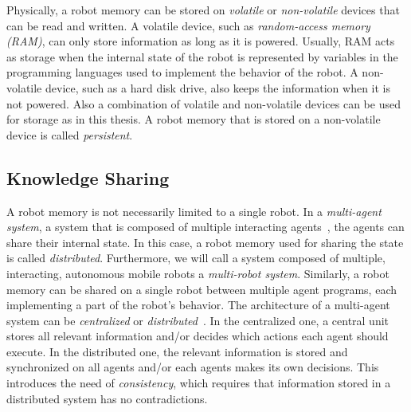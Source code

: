 Physically, a robot memory can be stored on \emph{volatile} or
\emph{non-volatile} devices that can be read and written. A volatile
device, such as \emph{random-access memory (RAM)}, can only store
information as long as it is powered. Usually, RAM acts as storage
when the internal state of the robot is represented by variables in
the programming languages used to implement the behavior of the
robot.  A non-volatile device, such as a hard disk drive, also keeps
the information when it is not powered. Also a combination of volatile
and non-volatile devices can be used for storage as in this thesis. A
robot memory that is stored on a non-volatile device is called
\emph{persistent}.

\subsection{Knowledge Sharing}
\label{sec:knowledge-sharing}
A robot memory is not necessarily limited to a single robot. In a
\emph{multi-agent system}, a system that is composed of multiple
interacting agents~\cite{multiagentsystems}, the agents can share
their internal state. In this case, a robot memory used for sharing
the state is called
\emph{distributed}. Furthermore, we will call a system composed
of multiple, interacting, autonomous mobile robots a \emph{multi-robot
  system}. Similarly, a robot memory can be shared on a single
robot between multiple agent programs, each implementing a part of
the robot's behavior. The architecture of a multi-agent system can be
\emph{centralized} or \emph{distributed}~\cite{RCLL-Planning}. In the centralized one,
a central unit stores all relevant information and/or decides which
actions each agent should execute. In the distributed one, the
relevant information is stored and synchronized on all agents and/or
each agents makes its own decisions. This introduces the need of
\emph{consistency}, which requires that information stored in a
distributed system has no contradictions.

